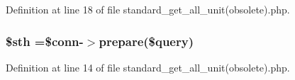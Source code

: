 Definition at line 18 of file standard\-\_\-get\-\_\-all\-\_\-unit(obsolete).\-php.

\hypertarget{standard__get__all__unit_07obsolete_08_8php_afa9126f9664959c02795be300a135f93}{
\subsubsection[{\$sth}]{\setlength{\rightskip}{0pt plus 5cm}\$sth =\$conn-\/$>$prepare(\$query)}}\label{standard__get__all__unit_07obsolete_08_8php_afa9126f9664959c02795be300a135f93}


Definition at line 14 of file standard\-\_\-get\-\_\-all\-\_\-unit(obsolete).\-php.

